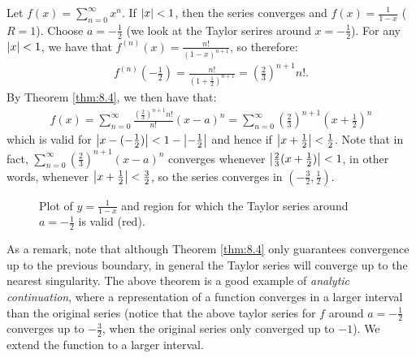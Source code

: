 \begin{nexample}{}{}
    Let $f(x) = \sum_{n=0}^\infty x^n$. If $\abs{x} < 1$, then the series converges and $f(x) = \frac{1}{1-x}$ ($R = 1$). Choose $a = -\frac{1}{2}$ (we look at the Taylor serires around $x = -\frac{1}{2}$). For any $\abs{x} < 1$, we have that $f^{(n)}(x) = \frac{n!}{(1-x)^{n+1}}$, so therefore:
    \begin{align*}
        f^{(n)}(-\frac{1}{2}) = \frac{n!}{(1+\frac{1}{2})^{n+1}} = \left(\frac{2}{3}\right)^{n+1}n!.
    \end{align*}
    By Theorem \ref{thm:8.4}, we then have that:
    \begin{align*}
        f(x) = \sum_{n=0}^\infty \frac{\left(\frac{2}{3}\right)^{n+1}n!}{n!}(x - a)^n = \sum_{n=0}^\infty \left(\frac{2}{3}\right)^{n+1}(x + \frac{1}{2})^n
    \end{align*}
    which is valid for $\abs{x - (-\frac{1}{2})} < 1 - \abs{-\frac{1}{2}}$ and hence if $\abs{x + \frac{1}{2}} < \frac{1}{2}$. Note that in fact, $\sum_{n=0}^\infty\left(\frac{2}{3}\right)^{n+1}(x - a)^n$ converges whenever $\abs{\frac{2}{3}(x + \frac{1}{2})} < 1$, in other words, whenever $\abs{x + \frac{1}{2}} < \frac{3}{2}$, so the series converges in $(-\frac{3}{2}, \frac{1}{2})$. 
\end{nexample}
\begin{figure}[htbp]
    \centering
    
    \caption{Plot of $y = \frac{1}{1-x}$ and region for which the Taylor series around $a = -\frac{1}{2}$ is valid (red).}
    \label{fig52}
\end{figure}
\noindent As a remark, note that although Theorem \ref{thm:8.4} only guarantees convergence up to the previous boundary, in general the Taylor series will converge up to the nearest singularity. The above theorem is a good example of \emph{analytic continuation}, where a representation of a function converges in a larger interval than the original series (notice that the above taylor series for $f$ around $a = -\frac{1}{2}$ converges up to $-\frac{3}{2}$, when the original series only converged up to $-1$). We extend the function to a larger interval.

